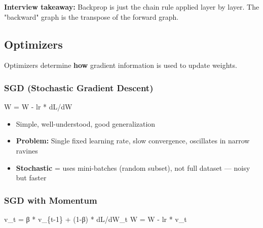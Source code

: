 \documentclass[11pt]{article}
\providecommand{\tightlist}{\setlength{\itemsep}{1pt}\setlength{\parskip}{0pt}}
\newenvironment{Shaded}{\begin{snugshade}}{\end{snugshade}}
\newcommand{\DecValTok}[1]{\textcolor[rgb]{0.96,0.45,0.00}{#1}}
\newcommand{\NormalTok}[1]{\textcolor[rgb]{0.81,0.81,0.76}{#1}}
\newcommand{\OperatorTok}[1]{\textcolor[rgb]{0.81,0.81,0.76}{#1}}
\begin{document}
\textbf{Interview takeaway:} Backprop is just the chain rule applied layer by layer. The "backward" graph is the transpose of the forward graph.

\subsection{Optimizers}\label{optimizers}

Optimizers determine \textbf{how} gradient information is used to update weights.

\subsubsection{SGD (Stochastic Gradient Descent)}\label{sgd-stochastic-gradient-descent}



\begin{Shaded}
\begin{Highlighting}[]
\NormalTok{W }\OperatorTok{=}\NormalTok{ W }\OperatorTok{{-}}\NormalTok{ lr }\OperatorTok{*}\NormalTok{ dL}\OperatorTok{/}\NormalTok{dW}
\end{Highlighting}
\end{Shaded}

\begin{itemize}
\tightlist
\item
  Simple, well-understood, good generalization
\item
  \textbf{Problem:} Single fixed learning rate, slow convergence, oscillates in narrow ravines
\item
  \textbf{Stochastic} = uses mini-batches (random subset), not full dataset --- noisy but faster
\end{itemize}

\subsubsection{SGD with Momentum}\label{sgd-with-momentum}


\begin{Shaded}
\begin{Highlighting}[]
\NormalTok{v\_t }\OperatorTok{=}\NormalTok{ β }\OperatorTok{*}\NormalTok{ v\_\{t}\OperatorTok{{-}}\DecValTok{1}\NormalTok{\} }\OperatorTok{+}\NormalTok{ (}\DecValTok{1}\OperatorTok{{-}}\NormalTok{β) }\OperatorTok{*}\NormalTok{ dL}\OperatorTok{/}\NormalTok{dW\_t}
\NormalTok{W }\OperatorTok{=}\NormalTok{ W }\OperatorTok{{-}}\NormalTok{ lr }\OperatorTok{*}\NormalTok{ v\_t}
\end{Highlighting}
\end{Shaded}
\end{document}
